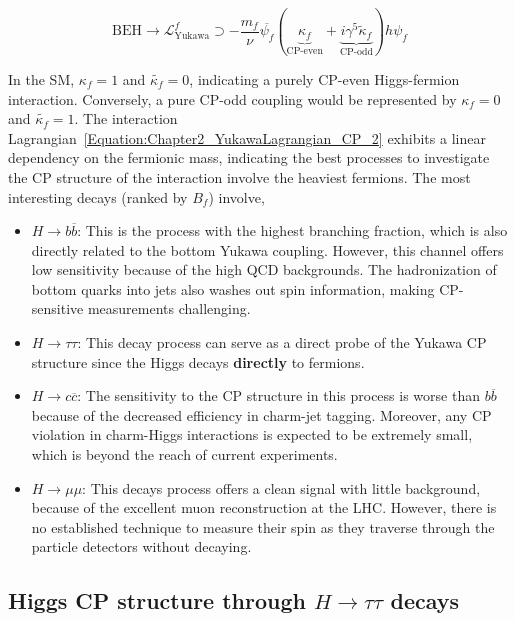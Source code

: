 \begin{equation}
    \text{BEH} \rightarrow \mathcal{L}_{\text{Yukawa}}^f \supset - \frac{m_f}{\nu}\overline{\psi_f} (\underbrace{\kappa_f}_{\text{CP-even}} + \underbrace{i\gamma^5\tilde{\kappa}_f}_{\text{CP-odd}})h\psi_f
\label{Equation:Chapter2_YukawaLagrangian_CP_2}
\end{equation}

In the SM, $\kappa_f = 1$ and $\tilde{\kappa_f} = 0$, indicating a purely CP-even Higgs-fermion interaction. Conversely, a pure CP-odd coupling would be represented by $\kappa_f = 0$ and $\tilde{\kappa_f} = 1$. The interaction Lagrangian~\ref{Equation:Chapter2_YukawaLagrangian_CP_2} exhibits a linear dependency on the fermionic mass, indicating the best processes to investigate the CP structure of the interaction involve the heaviest fermions. The most interesting decays (ranked by $B_f$) involve,

\begin{itemize}
    \item $H \to b\overline{b}$: This is the process with the highest branching fraction, which is also directly related to the bottom Yukawa coupling. However, this channel offers low sensitivity because of the high QCD backgrounds. The hadronization of bottom quarks into jets also washes out spin information, making CP-sensitive measurements challenging.

    \item $H \to \tau \tau$: This decay process can serve as a direct probe of the Yukawa CP structure since the Higgs decays \textbf{directly} to fermions. 

    \item $H \to c \overline{c}$: The sensitivity to the CP structure in this process is worse than $b\overline{b}$ because of the decreased efficiency in charm-jet tagging. Moreover, any CP violation in charm-Higgs interactions is expected to be extremely small, which is beyond the reach of current experiments.

    \item $H \to \mu \mu$: This decays process offers a clean signal with little background, because of the excellent muon reconstruction at the LHC. However, there is no established technique to measure their spin as they traverse through the particle detectors without decaying. 
\end{itemize}

\subsection{Higgs CP structure through \texorpdfstring{$H\to\tau\tau$}{H→tautau} decays}

